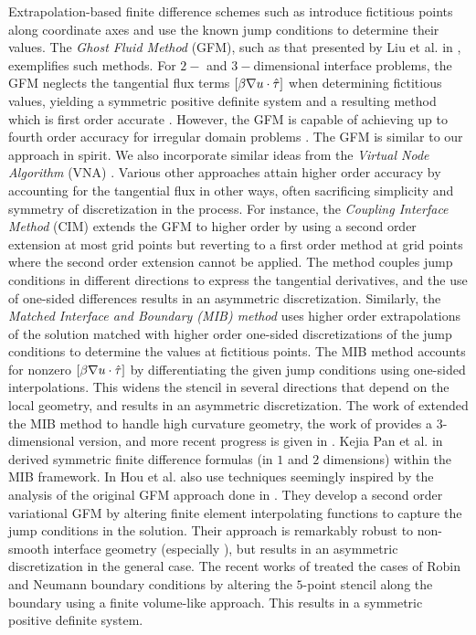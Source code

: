 Extrapolation-based finite difference schemes such as \cite{Liu.Xu-Dong00, Gibou02, Zhou06a, Gibou05, Jomaa05, Chern07} introduce fictitious points along coordinate axes and use the known jump conditions to determine their values. The \emph{Ghost Fluid Method} (GFM), such as that presented by Liu et al. in \cite{Liu.Xu-Dong00}, exemplifies such methods. For $2-$ and $3-$dimensional interface problems, the GFM neglects the tangential flux terms $\left[ \beta \nabla u \cdot \hat{\mathbf{\tau}} \right]$ when determining fictitious values, yielding a symmetric positive definite system and a resulting method which is first order accurate \cite{Liu.Xu-Dong00, Liu.Xu-Dong03}. However, the GFM is capable of achieving up to fourth order accuracy for irregular domain problems \cite{Gibou02, Gibou05}. The GFM is similar to our approach in spirit. We also incorporate similar ideas from the \emph{Virtual Node Algorithm} (VNA) \cite{Molino05, Bao.Zhaosheng07, Sifakis07}. Various other approaches attain higher order accuracy by accounting for the tangential flux in other ways, often sacrificing simplicity and symmetry of discretization in the process. For instance, the \emph{Coupling Interface Method} (CIM) \cite{Chern07} extends the GFM to higher order by using a second order extension at most grid points but reverting to a first order method at grid points where the second order extension cannot be applied. The method couples jump conditions in different directions to express the tangential derivatives, and the use of one-sided differences results in an asymmetric discretization. Similarly, the \emph{Matched Interface and Boundary \textnormal{(MIB)} method} \cite{Zhou06a} uses higher order extrapolations of the solution matched with higher order one-sided discretizations of the jump conditions to determine the values at fictitious points. The MIB method accounts for nonzero $\left[ \beta \nabla u \cdot \hat{\mathbf{\tau}} \right]$ by differentiating the given jump conditions using one-sided interpolations. This widens the stencil in several directions that depend on the local geometry, and results in an asymmetric discretization. The work of \cite{Zhou06b} extended the MIB method to handle high curvature geometry, the work of \cite{Yu.Sining07} provides a $3$-dimensional version, and more recent progress is given in \cite{Zhao09}. Kejia Pan et al. in \cite{Pan.Kejia10} derived symmetric finite difference formulas (in $1$ and $2$ dimensions) within the MIB framework. In \cite{Hou.Songming05,Hou.Songming10} Hou et al. also use techniques seemingly inspired by the analysis of the original GFM approach done in \cite{Liu.Xu-Dong00,Liu.Xu-Dong03}. They develop a second order variational GFM by altering finite element interpolating functions to capture the jump conditions in the solution. Their approach is remarkably robust to non-smooth interface geometry (especially \cite{Hou.Songming10}), but results in an asymmetric discretization in the general case. The recent works of \cite{Ng.YenTing09, Papac10} treated the cases of Robin and Neumann boundary conditions by altering the $5$-point stencil along the boundary using a finite volume-like approach. This results in a symmetric positive definite system.

